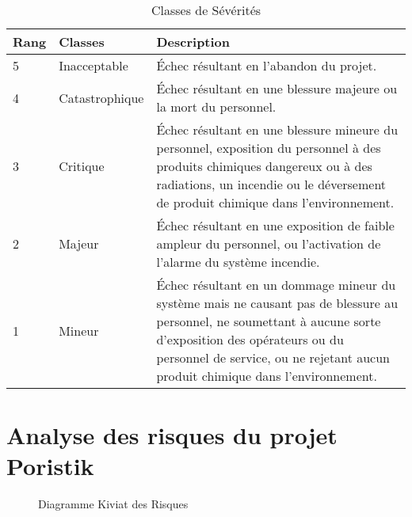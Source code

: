 \documentclass[12pt]{article}
\begin{document}
 
\begin{table}[H]
\centering
\caption{Classes de Sévérités}
\begin{tabular}{ p{2cm} p{3cm} p{8cm}}
\hline \bf Rang & \bf Classes & \bf Description \\

\hline 5 & Inacceptable & Échec résultant en l’abandon du projet.\\
4 & Catastrophique & Échec résultant en une blessure majeure ou la mort du personnel. \\
3 & Critique & Échec résultant en une blessure mineure du personnel, exposition du personnel à des produits chimiques dangereux ou à des radiations, un incendie ou le déversement de produit chimique dans l’environnement. \\
2 & Majeur & Échec résultant en une exposition de faible ampleur du personnel, ou l’activation de l’alarme du système incendie.\\
1 & Mineur & Échec résultant en un dommage mineur du système mais ne causant pas de blessure au personnel, ne soumettant à aucune sorte d’exposition des opérateurs ou du personnel de service, ou ne rejetant aucun produit chimique dans l’environnement. \\
\hline
\end{tabular}
\end{table}

\section{Analyse des risques du projet Poristik}
\newpage
\begin{figure}
\caption{Diagramme Kiviat des Risques}
\end{figure}
\end{document}
